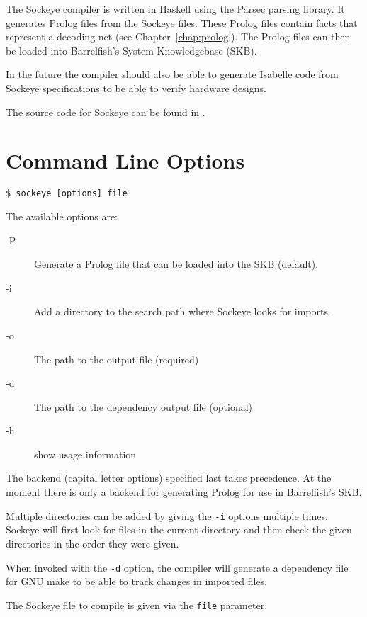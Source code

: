\documentclass[a4paper,11pt,twoside]{report}
\begin{document}
{{{The Sockeye compiler is written in Haskell using the Parsec parsing library. It
generates Prolog files from the Sockeye files. These Prolog files contain facts that represent a decoding net (see Chapter~\ref{chap:prolog}).
The Prolog files can then be loaded into Barrelfish's System Knowledgebase (SKB).

In the future the compiler should also be able to generate Isabelle code from Sockeye specifications to be able to verify hardware designs.

The source code for Sockeye can be found in .

\clearpage
\section{Command Line Options}

\begin{verbatim}
$ sockeye [options] file
\end{verbatim}


The available options are:
\begin{description}
\item[-P] Generate a Prolog file that can be loaded into the SKB (default).
\item[-i] Add a directory to the search path where Sockeye looks for imports.
\item[-o]  The path to the output file (required)
\item[-d]  The path to the dependency output file (optional)
\item[-h] show usage information
\end{description}

The backend (capital letter options) specified last takes precedence.
At the moment there is only a backend for generating Prolog for use in Barrelfish's SKB.

Multiple directories can be added by giving the \texttt{-i} options multiple times.
Sockeye will first look for files in the current directory and then check the given directories in the order they were given.

When invoked with the \texttt{-d} option, the compiler will generate a dependency file for GNU make to be able to track changes in imported files.

The Sockeye file to compile is given via the \texttt{file} parameter.


}}}
\end{document}
